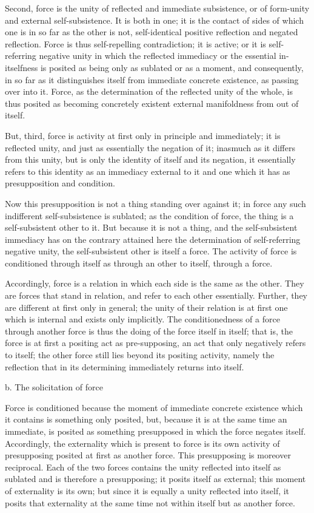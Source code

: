 Second, force is the unity of
reflected and immediate subsistence,
or of form-unity and external self-subsistence.
It is both in one;
it is the contact of sides of
which one is in so far as the other is not,
self-identical positive reflection and negated reflection.
Force is thus self-repelling contradiction;
it is active;
or it is self-referring negative unity
in which the reflected immediacy
or the essential in-itselfness is
posited as being only as sublated or as a moment,
and consequently, in so far as it distinguishes itself
from immediate concrete existence,
as passing over into it.
Force, as the determination of
the reflected unity of the whole,
is thus posited as  becoming
concretely existent external manifoldness
from out of itself.

But, third, force is activity at first only
in principle and immediately;
it is reflected unity,
and just as essentially the negation of it;
inasmuch as it differs from this unity,
but is only the identity of itself and its negation,
it essentially refers to this identity as
an immediacy external to it
and one which it has as
presupposition and condition.

Now this presupposition is not
a thing standing over against it;
in force any such indifferent
self-subsistence is sublated;
as the condition of force,
the thing is a self-subsistent other to it.
But because it is not a thing,
and the self-subsistent immediacy has
on the contrary attained here the
determination of self-referring negative unity,
the self-subsistent other is itself a force.
The activity of force is conditioned
through itself as through an other to itself,
through a force.

Accordingly, force is a relation
in which each side is the same as the other.
They are forces that stand in relation,
and refer to each other essentially.
Further, they are different at first only in general;
the unity of their relation
is at first one which is internal and exists only implicitly.
The conditionedness of a force through another force is
thus the doing of the force itself in itself;
that is, the force is at first a positing act as pre-supposing,
an act that only negatively refers to itself;
the other force still lies beyond its positing activity,
namely the reflection that in its determining
immediately returns into itself.

b. The solicitation of force

Force is conditioned because
the moment of immediate concrete existence
which it contains is something only posited,
but, because it is at the same time an immediate,
is posited as something presupposed in which
the force negates itself.
Accordingly, the externality
which is present to force is its
own activity of presupposing posited
at first as another force.
This presupposing is moreover reciprocal.
Each of the two forces contains the unity
reflected into itself as sublated
and is therefore a presupposing;
it posits itself as external;
this moment of externality is its own;
but since it is equally a unity reflected into itself,
it posits that externality at the same time
not within itself but as another force.

